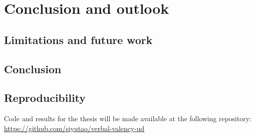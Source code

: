 \chapter{Conclusion and outlook}\label{chapter:conclusion}
\section{Limitations and future work}

\section{Conclusion}

\section{Reproducibility}
Code and results for the thesis will be made available at the following repository: \url{https://github.com/siyutao/verbal-valency-ud}
